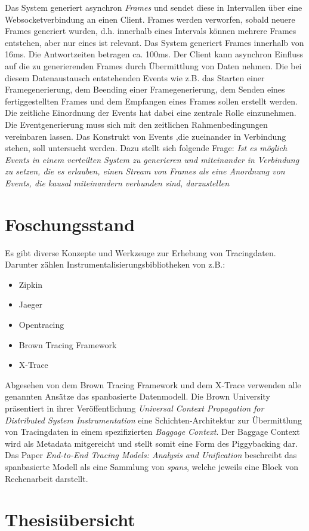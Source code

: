 	Das System generiert asynchron \emph{Frames} und sendet diese in Intervallen über eine Websocketverbindung an einen Client. Frames werden verworfen, sobald neuere Frames generiert wurden, d.h. innerhalb eines Intervals können mehrere Frames entstehen, aber nur eines ist relevant. Das System generiert Frames innerhalb von 16ms. Die Antwortzeiten betragen ca. 100ms. Der Client kann asynchron Einfluss auf die zu generierenden Frames durch Übermittlung von Daten nehmen. Die bei diesem Datenaustausch entstehenden Events wie z.B. das Starten einer Framegenerierung, dem Beending einer Framegenerierung, dem Senden eines fertiggestellten Frames und dem Empfangen eines Frames sollen erstellt werden. Die zeitliche Einordnung der Events hat dabei eine zentrale Rolle einzunehmen. Die Eventgenerierung muss sich mit den zeitlichen Rahmenbedingungen vereinbaren lassen. Das Konstrukt von Events ,die zueinander in Verbindung stehen, soll untersucht werden. Dazu stellt sich folgende Frage: \emph{Ist es möglich Events in einem verteilten System zu generieren und miteinander in Verbindung zu setzen, die es erlauben, einen Stream von Frames als eine Anordnung von Events, die kausal miteinandern verbunden sind, darzustellen}
\section{Foschungsstand}
\label{section:Forschungsstand}

Es gibt diverse Konzepte und Werkzeuge zur Erhebung von Tracingdaten. Darunter zählen Instrumentalisierungsbibliotheken von z.B.:
\begin{itemize}
	\item Zipkin
	\item Jaeger
	\item Opentracing
	\item Brown Tracing Framework
	\item X-Trace
\end{itemize}
Abgesehen von dem Brown Tracing Framework und dem X-Trace verwenden alle genannten Ansätze das spanbasierte Datenmodell. Die Brown University präsentiert in ihrer Veröffentlichung \emph{Universal Context Propagation for Distributed System Instrumentation} eine Schichten-Architektur zur Übermittlung von Tracingdaten in einem spezifizierten \emph{Baggage Context}. Der Baggage Context wird als Metadata mitgereicht und stellt somit eine Form des Piggybacking dar. Das Paper \emph{End-to-End Tracing Models: Analysis and Unification} beschreibt das spanbasierte Modell als eine Sammlung von \emph{spans}, welche jeweils eine Block von Rechenarbeit darstellt.

\section{Thesisübersicht}
\label{section:Thesisübersicht}

